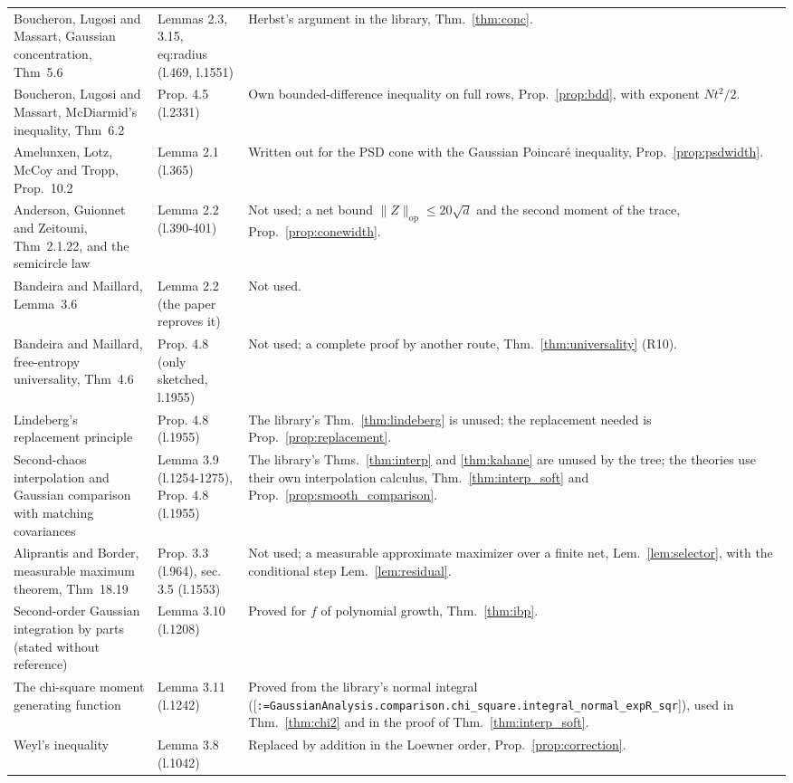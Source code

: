 \documentclass[11pt]{article}
\makeatletter
\newcommand{\formal@break}[1]{\@tfor\formal@tok:=#1\do{%
  \formal@tok
  \expandafter\ifx\formal@tok.\allowbreak\else
  \expandafter\ifx\formal@tok\_\allowbreak\fi\fi}}
\DeclareRobustCommand{\formal}[1]{\textnormal{[\texttt{\small\formal@break{#1}}]}}
\newcommand{\norm}[1]{\lVert #1\rVert}
\newcommand{\op}{\mathrm{op}}
\newcommand{\sqd}{\sqrt{d}}
\theoremstyle{plain}
\theoremstyle{definition}
\makeatother
\begin{document}
\begin{longtable}{@{}>{\raggedright\arraybackslash}p{42mm}>{\raggedright\arraybackslash}p{32mm}>{\raggedright\arraybackslash}p{72mm}@{}}
Boucheron, Lugosi and Massart, Gaussian concentration, Thm~5.6 & Lemmas 2.3, 3.15, eq:radius (l.469, l.1551) & Herbst's argument in the library, Thm.~\ref{thm:conc}.\\
Boucheron, Lugosi and Massart, McDiarmid's inequality, Thm~6.2 & Prop. 4.5 (l.2331) & Own bounded-difference inequality on full rows, Prop.~\ref{prop:bdd}, with exponent $Nt^2/2$.\\
Amelunxen, Lotz, McCoy and Tropp, Prop.~10.2 & Lemma 2.1 (l.365) & Written out for the PSD cone with the Gaussian Poincar\'e inequality, Prop.~\ref{prop:psdwidth}.\\
Anderson, Guionnet and Zeitouni, Thm~2.1.22, and the semicircle law & Lemma 2.2 (l.390-401) & Not used; a net bound $\norm{Z}_\op \le 20\sqd$ and the second moment of the trace, Prop.~\ref{prop:conewidth}.\\
Bandeira and Maillard, Lemma~3.6 & Lemma 2.2 (the paper reproves it) & Not used.\\
Bandeira and Maillard, free-entropy universality, Thm~4.6 & Prop. 4.8 (only sketched, l.1955) & Not used; a complete proof by another route, Thm.~\ref{thm:universality} (R10).\\
Lindeberg's replacement principle & Prop. 4.8 (l.1955) & The library's Thm.~\ref{thm:lindeberg} is unused; the replacement needed is Prop.~\ref{prop:replacement}.\\
Second-chaos interpolation and Gaussian comparison with matching covariances & Lemma 3.9 (l.1254-1275), Prop. 4.8 (l.1955) & The library's Thms.~\ref{thm:interp} and \ref{thm:kahane} are unused by the tree; the theories use their own interpolation calculus, Thm.~\ref{thm:interp_soft} and Prop.~\ref{prop:smooth_comparison}.\\
Aliprantis and Border, measurable maximum theorem, Thm~18.19 & Prop. 3.3 (l.964), sec. 3.5 (l.1553) & Not used; a measurable approximate maximizer over a finite net, Lem.~\ref{lem:selector}, with the conditional step Lem.~\ref{lem:residual}.\\
Second-order Gaussian integration by parts (stated without reference) & Lemma 3.10 (l.1208) & Proved for $f$ of polynomial growth, Thm.~\ref{thm:ibp}.\\
The chi-square moment generating function & Lemma 3.11 (l.1242) & Proved from the library's normal integral (\formal{GaussianAnalysis.comparison.chi\_square.integral\_normal\_expR\_sqr}), used in Thm.~\ref{thm:chi2} and in the proof of Thm.~\ref{thm:interp_soft}.\\
Weyl's inequality & Lemma 3.8 (l.1042) & Replaced by addition in the Loewner order, Prop.~\ref{prop:correction}.\\

\end{longtable}
\end{document}
